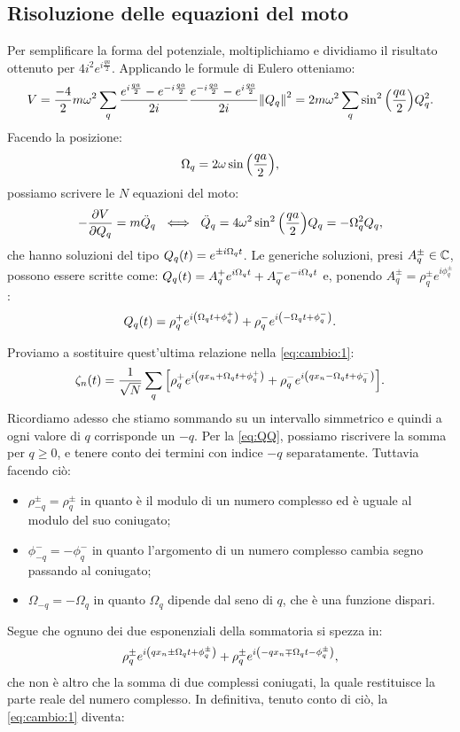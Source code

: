     \subsection{Risoluzione delle equazioni del moto}
        Per semplificare la forma del potenziale, moltiplichiamo e dividiamo il risultato ottenuto per $\displaystyle 4i^2e^{i\frac{qa}{2}}$. Applicando le formule di Eulero otteniamo:
            $$V=\frac{-4}{2}m\omega^2\sum_q\frac{e^{i\frac{qa}{2}}-e^{-i\frac{qa}{2}}}{2i}\frac{e^{-i\frac{qa}{2}}-e^{i\frac{qa}{2}}}{2i}\norm{Q_q}^2=2m\omega^2\sum_q\sin^2\qty(\frac{qa}{2})Q_q^2.$$
        Facendo la posizione:
        \begin{equation}
            \Omega_q=2\omega\sin\qty(\frac{qa}{2}),
            \label{eq:omega:1}
        \end{equation}
        possiamo scrivere le $N$ equazioni del moto:
            $$-\pdv{V}{Q_q}=m\ddot{Q}_q\ \iff\ \ddot{Q}_q=4\omega^2\sin^2\qty(\frac{qa}{2})Q_q=-\Omega_q^2Q_q,$$
        che hanno soluzioni del tipo $\displaystyle Q_q\qty(t)=e^{\pm i\Omega_qt}$. Le generiche soluzioni, presi $A_q^\pm\in\mathbb{C}$, possono essere scritte come: $\displaystyle Q_q\qty(t)=A_q^+e^{i\Omega_qt}+A_q^-e^{-i\Omega_qt}$ e, ponendo $\displaystyle A_q^\pm=\rho_q^\pm e^{i\phi_q^\pm}$:
            $$Q_q\qty(t)=\rho_q^+e^{i\qty(\Omega_qt+\phi_q^+)}+\rho_q^-e^{i\qty(-\Omega_qt+\phi_q^-)}.$$
        \par Proviamo a sostituire quest'ultima relazione nella \eqref{eq:cambio:1}:
            $$\zeta_n\qty(t)=\frac{1}{\sqrt{N}}\sum_q\qty[\rho_q^+e^{i\qty(qx_n+\Omega_qt+\phi_q^+)}+\rho_q^-e^{i\qty(qx_n-\Omega_qt+\phi_q^-)}].$$
        Ricordiamo adesso che stiamo sommando su un intervallo simmetrico e quindi a ogni valore di $q$ corrisponde un $-q$. Per la \eqref{eq:QQ}, possiamo riscrivere la somma per $q\geq 0$, e tenere conto dei termini con indice $-q$ separatamente. Tuttavia facendo ci\`o: 
        \begin{itemize}
            \item $\rho_{-q}^\pm=\rho_{q}^\pm$ in quanto \`e il modulo di un numero complesso ed \`e uguale al modulo del suo coniugato;
            \item $\phi_{-q}^-=-\phi_q^-$ in quanto l'argomento di un numero complesso cambia segno passando al coniugato;
            \item $\Omega_{-q}=-\Omega_q$ in quanto $\Omega_q$ dipende dal seno di $q$, che \`e una funzione dispari.
        \end{itemize}
        Segue che ognuno dei due esponenziali della sommatoria si spezza in: $$\rho_q^\pm e^{i\qty(qx_n\pm\Omega_qt+\phi_q^\pm)}+\rho_{q}^\pm e^{i\qty(-qx_n\mp\Omega_qt-\phi_{q}^\pm)},$$ che non \`e altro che la somma di due complessi coniugati, la quale restituisce la parte reale del numero complesso. In definitiva, tenuto conto di ci\`o, la \eqref{eq:cambio:1} diventa:
